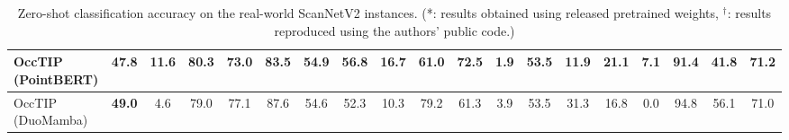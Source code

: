 \begin{table*}[t]
{\begin{tabular}{l|c|ccccccccccccccccc}
    OccTIP (PointBERT) & \textbf{47.8} & 11.6 & 80.3 & 73.0 & 83.5 & 54.9 & 56.8 & 16.7 & 61.0 & 72.5 & 1.9 & 53.5 & 11.9 & 21.1 & 7.1 & 91.4 & 41.8 & 71.2 \\ 
    \midrule
    \rowcolor{gray!20}
    OccTIP (DuoMamba) & \textbf{49.0} & 4.6 & 79.0 & 77.1 & 87.6 & 54.6 & 52.3 & 10.3 & 79.2 & 61.3 & 3.9 & 53.5 & 31.3 & 16.8 & 0.0 & 94.8 & 56.1 & 71.0 \\
    \bottomrule
    \end{tabular}%
    }
\caption{Zero-shot classification accuracy on the real-world ScanNetV2 \cite{scannetv2} instances. (*: results obtained using released pretrained weights, $^\dagger$: results reproduced using the authors' public code.)}
\label{tab:zeroshot_scannet}    
\vspace{-5mm}
\end{table*}